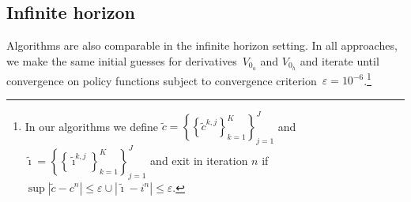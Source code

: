 \documentclass[a4paper,12pt]{article}
\begin{document}
\subsection{Infinite horizon}

Algorithms are also comparable in the infinite horizon setting. In all approaches, we make the same initial guesses for derivatives~$V_{0_{a}}$ and $V_{0_{h}}$ and iterate until convergence on policy functions subject to convergence criterion~$\varepsilon = 10^{-6}$.\footnote{In our algorithms we define $\tilde{c} = \left\{\left\{\tilde{c}^{k,j}\right\}_{k=1}^{K}\right\}_{j=1}^{J}$ and $\tilde{\imath} = \left\{\left\{\tilde{\imath}^{k,j}\right\}_{k=1}^{K}\right\}_{j=1}^{J}$ and exit in iteration $n$ if $\sup |\tilde{c}-c^{n}| \leq \varepsilon \cup |\tilde{\imath}-i^{n}| \leq \varepsilon.$}
\end{document}
